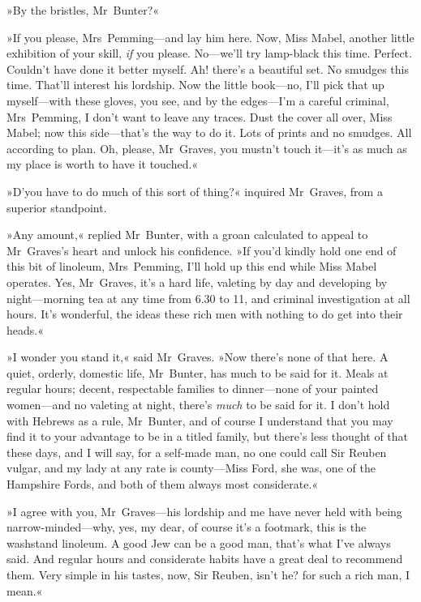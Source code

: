 »By the bristles, Mr~Bunter?«

»If you please, Mrs~Pemming—and lay him here. Now, Miss Mabel, another little exhibition of your skill, \textit{if} you please. No—we'll try lamp-black this time. Perfect. Couldn't have done it better myself. Ah! there's a beautiful set. No smudges this time. That'll interest his lordship. Now the little book—no, I'll pick that up myself—with these gloves, you see, and by the edges—I'm a careful criminal, Mrs~Pemming, I don't want to leave any traces. Dust the cover all over, Miss Mabel; now this side—that's the way to do it. Lots of prints and no smudges. All according to plan. Oh, please, Mr~Graves, you mustn't touch it—it's as much as my place is worth to have it touched.«

»D'you have to do much of this sort of thing?« inquired Mr~Graves, from a superior standpoint.

»Any amount,« replied Mr~Bunter, with a groan calculated to appeal to Mr~Graves's heart and unlock his confidence. »If you'd kindly hold one end of this bit of linoleum, Mrs~Pemming, I'll hold up this end while Miss Mabel operates. Yes, Mr~Graves, it's a hard life, valeting by day and developing by night—morning tea at any time from 6.30 to 11, and criminal investigation at all hours. It's wonderful, the ideas these rich men with nothing to do get into their heads.«

»I wonder you stand it,« said Mr~Graves. »Now there's none of that here. A quiet, orderly, domestic life, Mr~Bunter, has much to be said for it. Meals at regular hours; decent, respectable families to dinner—none of your painted women—and no valeting at night, there's \textit{much} to be said for it. I don't hold with Hebrews as a rule, Mr~Bunter, and of course I understand that you may find it to your advantage to be in a titled family, but there's less thought of that these days, and I will say, for a self-made man, no one could call Sir Reuben vulgar, and my lady at any rate is county—Miss Ford, she was, one of the Hampshire Fords, and both of them always most considerate.«

»I agree with you, Mr~Graves—his lordship and me have never held with being narrow-minded—why, yes, my dear, of course it's a footmark, this is the washstand linoleum. A good Jew can be a good man, that's what I've always said. And regular hours and considerate habits have a great deal to recommend them. Very simple in his tastes, now, Sir Reuben, isn't he? for such a rich man, I mean.«

